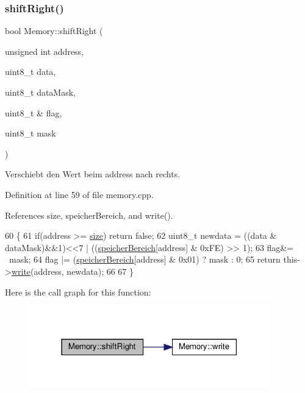 \subsubsection{\texorpdfstring{shift\+Right()}{shiftRight()}}
{\footnotesize\ttfamily bool Memory\+::shift\+Right (\begin{DoxyParamCaption}\item[{unsigned int}]{address,  }\item[{uint8\+\_\+t}]{data,  }\item[{uint8\+\_\+t}]{data\+Mask,  }\item[{uint8\+\_\+t \&}]{flag,  }\item[{uint8\+\_\+t}]{mask }\end{DoxyParamCaption})}

Verschiebt den Wert beim {\ttfamily address} nach rechts. 

Definition at line 59 of file memory.\+cpp.



References size, speicher\+Bereich, and write().


\begin{DoxyCode}
60 \{
61     \textcolor{keywordflow}{if}(address >= \mbox{\hyperlink{class_memory_a97e5472d284e8daceeb740acb2170ae0}{size}}) \textcolor{keywordflow}{return} \textcolor{keyword}{false};
62     uint8\_t newdata = ((data & dataMask)&&1)<<7 | ((\mbox{\hyperlink{class_memory_a31e171332b705e39bb13e421c7863a5f}{speicherBereich}}[address] & 0xFE) >> 1); 
63     flag&= ~mask;
64     flag |= (\mbox{\hyperlink{class_memory_a31e171332b705e39bb13e421c7863a5f}{speicherBereich}}[address] & 0x01) ? mask : 0;
65     \textcolor{keywordflow}{return} this->\mbox{\hyperlink{class_memory_a0e00ea7d13e602be37af361426aa3a50}{write}}(address, newdata);
66 
67 \}
\end{DoxyCode}
Here is the call graph for this function\+:
\nopagebreak
\begin{figure}[H]
\begin{center}
\leavevmode
\includegraphics[width=295pt]{class_memory_af57be7a362ba6670fc983ac5cceb34a5_cgraph}
\end{center}
\end{figure}
\mbox{\label{class_memory_a0e00ea7d13e602be37af361426aa3a50}} 
